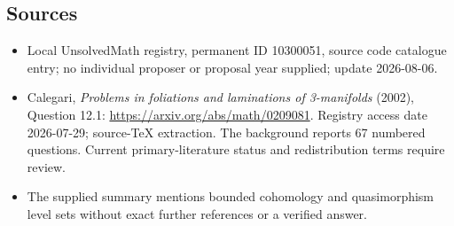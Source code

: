 \documentclass[11pt]{article}
\begin{document}
\subsection{Sources}
\begin{itemize}
\item Local UnsolvedMath registry, permanent ID 10300051, source code catalogue entry; no individual proposer or proposal year supplied; update 2026-08-06.
\item Calegari, \emph{Problems in foliations and laminations of 3-manifolds} (2002), Question 12.1: \url{https://arxiv.org/abs/math/0209081}. Registry access date 2026-07-29; source-TeX extraction. The background reports 67 numbered questions. Current primary-literature status and redistribution terms require review.
\item The supplied summary mentions bounded cohomology and quasimorphism level sets without exact further references or a verified answer.
\end{itemize}
\end{document}

